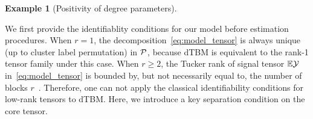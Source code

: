 \documentclass[lettersize,onecolumn,journal]{IEEEtran}
\theoremstyle{definition}
\theoremstyle{definition}
\newtheorem{example}{Example}
\begin{document}
\begin{example}[Positivity of degree parameters]
\end{example}

We first provide the identifiablity conditions for our model before estimation procedures. When $r=1$, the decomposition~\eqref{eq:model_tensor} is always unique (up to cluster label permutation) in $\mathcal{P}$, because dTBM is equivalent to the rank-1 tensor family under this case. When $r\geq 2$, the Tucker rank of signal tensor $\mathbb{E}\mathcal{Y}$ in~\eqref{eq:model_tensor} is bounded by, but not necessarily equal to, the number of blocks $r$~\citep{wang2019multiway}. Therefore, one can not apply the classical identifiability conditions for low-rank tensors to dTBM. Here, we introduce a key separation condition on the core tensor. 
\end{document}
